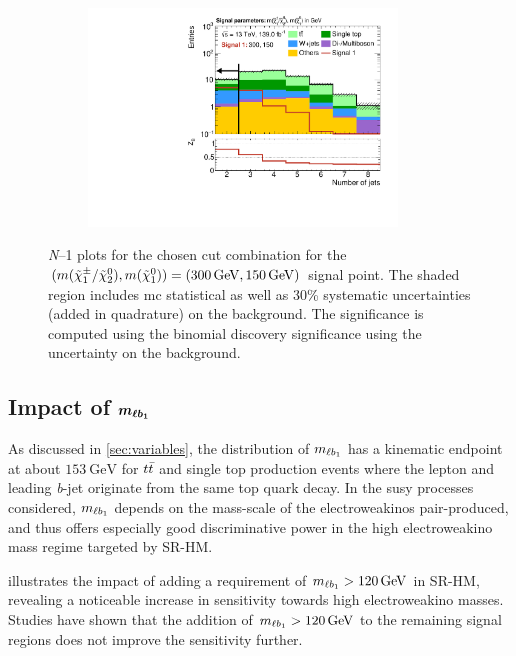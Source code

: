 \begin{figure}
\begin{subfigure}[b]{0.5\linewidth}
	\end{subfigure}\hfill
	\begin{subfigure}[b]{0.5\linewidth}
		\centering\includegraphics[width=0.9\textwidth]{N-1_cut_scan/n1_300_150/nJet30}
	\end{subfigure}

	\caption[\textit{N}--1 plots for the chosen cut combination for the (300, 150) signal point]{\textit{N}--1 plots for the chosen cut combination for the $(m(\charg/\neutr), m(\lsp)) = (\SI{300}{\GeV}, \SI{150}{\GeV})$ signal point. The shaded region includes \gls{mc} statistical as well as 30\% systematic uncertainties (added in quadrature) on the background. The significance is computed using the binomial discovery significance using the uncertainty on the background.}
	\label{fig:results_n1_300_150}
\end{figure}

\FloatBarrier

\subsection[Impact of $\mlb$]{Impact of $\boldsymbol{m_{\ell b_{1}}}$}


As discussed in \cref{sec:variables}, the distribution of $\mlb$ has a kinematic endpoint at about $\SI{153}{\GeV}$ for $t\bar{t}$ and single top production events where the lepton and leading \textit{b}-jet originate from the same top quark decay. In the \gls{susy} processes considered, $\mlb$ depends on the mass-scale of the electroweakinos pair-produced, and thus offers especially good discriminative power in the high electroweakino mass regime targeted by SR-HM.

 illustrates the impact of adding a requirement of $\mlb > \SI{120}{\GeV}$ in SR-HM, revealing a noticeable increase in sensitivity towards high electroweakino masses. Studies have shown that the addition of $\mlb > \SI{120}{\GeV}$ to the remaining signal regions does not improve the sensitivity further.

